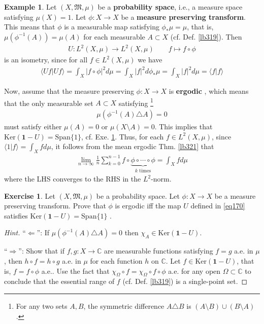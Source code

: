 \documentclass[12pt,b5paper,notitlepage]{article}
\theoremstyle{definition}
\newtheorem{eg}[df]{Example}
\newtheorem{exe}[df]{Exercise}
\theoremstyle{plain}
\newcommand{\fk}{\mathfrak}
\newcommand{\idt}{\mathbf{1}}
\newcommand{\Span}{\mathrm{Span}}
\newcommand{\bk}[1]{\langle {#1}\rangle}
\newcommand{\Cbb}{\mathbb C}
\newcommand{\Ker}{\mathrm{Ker}}
\newcommand{\hqed}{\hfill\qedsymbol}
\numberwithin{equation}{section}
\begin{document}
\begin{eg}
Let $(X,\fk M,\mu)$ be a \textbf{probability space},  i.e., a measure space satisfying $\mu(X)=1$. Let $\phi:X\rightarrow X$ be a \textbf{measure preserving transform}.  This means that $\phi$ is a measurable map satisfying $\phi_*\mu=\mu$, that is, $\mu(\phi^{-1}(A))=\mu(A)$ for each measurable $A\subset X$ (cf. Def. \ref{lb319}). Then
\begin{align}\label{eq170}
U:L^2(X,\mu)\rightarrow L^2(X,\mu)\qquad f\mapsto f\circ\phi
\end{align}
is an isometry, since for all $f\in L^2(X,\mu)$ we have
\begin{align*}
\bk{Uf|Uf}=\int_X |f\circ\phi|^2 d\mu=\int_X|f|^2d\phi_*\mu=\int_X|f|^2d\mu=\bk{f|f}
\end{align*}

Now, assume that the measure preserving $\phi:X\rightarrow X$ is \textbf{ergodic} , which means that the only measurable set $A\subset X$ satisfying \footnote{For any two sets $A,B$, the symmetric difference $A\triangle B$ is $(A\setminus B)\cup (B\setminus A)$.}
\begin{align*}
\mu(\phi^{-1}(A)\triangle A)=0
\end{align*}
must satisfy either $\mu(A)=0$ or $\mu(X\setminus A)=0$. This implies that $\Ker(\idt-U)=\Span\{1\}$, cf. Exe. \ref{lb320}. Thus, for each $f\in L^2(X,\mu)$, since $\bk{1|f}=\int_Xfd\mu$, it follows from the mean ergodic Thm. \ref{lb321} that
\begin{align*}
\lim_{n\rightarrow\infty}\frac {1}{n}\sum_{k=0}^{n-1}f\circ\underbrace{\phi\circ\cdots\circ\phi}_{k\text{ times}}=\int_Xfd\mu
\end{align*}
where the LHS converges to the RHS in the $L^2$-norm.  \hqed
\end{eg}


\begin{exe}\label{lb320}
Let $(X,\fk M,\mu)$ be a probability space. Let $\phi:X\rightarrow X$ be a measure preserving transform. Prove that $\phi$ is ergodic iff the map $U$ defined in \eqref{eq170} satisfies $\Ker(\idt-U)=\Span\{1\}$ .
\end{exe}

\begin{proof}[Hint]
``$\Leftarrow$'': If $\mu(\phi^{-1}(A)\triangle A)=0$ then $\chi_A\in\Ker(\idt-U)$.

``$\Rightarrow$'': Show that if $f,g:X\rightarrow\Cbb$ are measurable functions satisfying $f=g$ a.e. in $\mu$, then $h\circ f=h\circ g$ a.e. in $\mu$ for each function $h$ on $\Cbb$. Let $f\in\Ker(\idt-U)$, that is, $f=f\circ\phi$ a.e.. Use the fact that $\chi_\Omega\circ f=\chi_\Omega\circ f\circ\phi$ a.e. for any open $\Omega\subset\Cbb$ to conclude that the essential range of $f$ (cf. Def. \ref{lb319}) is a single-point set.
\end{proof}
\end{document}
